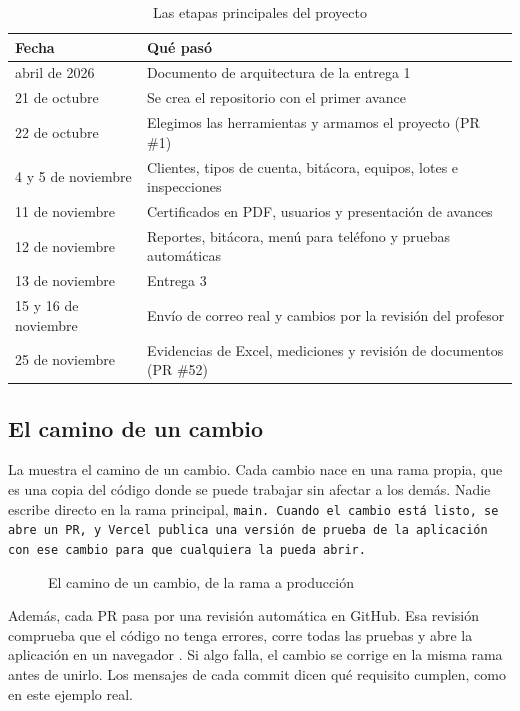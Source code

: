 \begin{table}[H]
  \centering
  \caption{Las etapas principales del proyecto}\label{tab:cronologia}
  \begin{tabular}{@{}ll@{}}
    \toprule
    Fecha & Qué pasó \\
    \midrule
    abril de 2026 & Documento de arquitectura de la entrega 1 \\
    21 de octubre & Se crea el repositorio con el primer avance \\
    22 de octubre & Elegimos las herramientas y armamos el proyecto (PR \#1) \\
    4 y 5 de noviembre & Clientes, tipos de cuenta, bitácora, equipos, lotes e inspecciones \\
    11 de noviembre & Certificados en PDF, usuarios y presentación de avances \\
    12 de noviembre & Reportes, bitácora, menú para teléfono y pruebas automáticas \\
    13 de noviembre & Entrega 3 \\
    15 y 16 de noviembre & Envío de correo real y cambios por la revisión del profesor \\
    25 de noviembre & Evidencias de Excel, mediciones y revisión de documentos (PR \#52) \\
    \bottomrule
  \end{tabular}
\end{table}

\subsection{El camino de un cambio}\label{sec:github}

La  muestra el camino de un cambio. Cada cambio nace en una rama propia, que es una copia del código donde se puede trabajar sin afectar a los demás. Nadie escribe directo en la rama principal, \tt{main}. Cuando el cambio está listo, se abre un PR, y Vercel publica una versión de prueba de la aplicación con ese cambio para que cualquiera la pueda abrir.

\begin{figure}[H]
  \centering
  
  \caption{El camino de un cambio, de la rama a producción}\label{fig:cambio}
\end{figure}

Además, cada PR pasa por una revisión automática en GitHub. Esa revisión comprueba que el código no tenga errores, corre todas las pruebas y abre la aplicación en un navegador \parencite{playwright}. Si algo falla, el cambio se corrige en la misma rama antes de unirlo. Los mensajes de cada commit dicen qué requisito cumplen, como en este ejemplo real.

